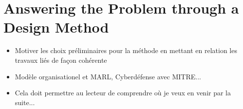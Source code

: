 \section{Answering the Problem through a Design Method}
\begin{itemize}
    \item Motiver les choix préliminaires pour la méthode en mettant en relation les travaux liés de façon cohérente
    \item Modèle organisationel et MARL, Cyberdéfense avec MITRE...
    \item Cela doit permettre au lecteur de comprendre où je veux en venir par la suite...
\end{itemize}
